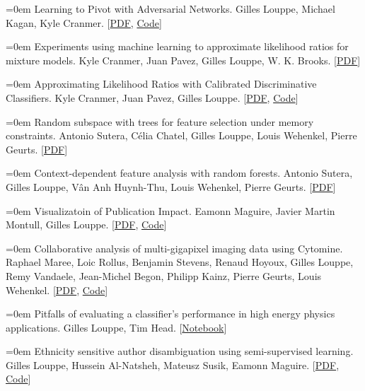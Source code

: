 \documentclass{scrartcl}
\newcommand{\MarginText}[1]{\marginpar{\raggedleft\itshape\small#1}}
\newcommand{\NewPublication}[4]{\noindent\hangindent=0em\hangafter=0 \MarginText{\color{black} #1}{\footnotesize [{\color{Maroon}#2}]} #3 {\footnotesize\color{gray}#4}\vspace{0.5em}}
\begin{document}
\begin{cv}{}
\vspace{1em}

\NewPublication{2016}{22}{Learning to Pivot with Adversarial Networks.}{%
Gilles Louppe, Michael Kagan, Kyle Cranmer.
[\href{https://arxiv.org/abs/1611.01046}{PDF}, \href{https://github.com/glouppe/paper-learning-to-pivot}{Code}]}

\NewPublication{}{21}{Experiments using machine learning to approximate likelihood ratios for mixture models.}{%
Kyle Cranmer, Juan Pavez, Gilles Louppe, W. K. Brooks.
[\href{http://iopscience.iop.org/article/10.1088/1742-6596/762/1/012034/pdf}{PDF}]}

\NewPublication{}{20}{Approximating Likelihood Ratios with Calibrated Discriminative Classifiers.}{%
Kyle Cranmer, Juan Pavez, Gilles Louppe.
[\href{http://arxiv.org/abs/1506.02169}{PDF}, \href{https://github.com/diana-hep/carl}{Code}]}

\NewPublication{}{19}{Random subspace with trees for feature selection under memory constraints.}{%
Antonio Sutera, Célia Chatel, Gilles Louppe, Louis Wehenkel, Pierre Geurts.
[\href{http://hdl.handle.net/2268/202206}{PDF}]}

\NewPublication{}{18}{Context-dependent feature analysis with random forests.}{%
Antonio Sutera, Gilles Louppe, Vân Anh Huynh-Thu, Louis Wehenkel, Pierre Geurts.
[\href{https://arxiv.org/abs/1605.03848}{PDF}]}

\NewPublication{}{17}{Visualizatoin of Publication Impact.}{%
Eamonn Maguire, Javier Martin Montull, Gilles Louppe.
[\href{https://arxiv.org/abs/1605.06242}{PDF}, \href{https://github.com/inspirehep/impact-graphs}{Code}]}

\NewPublication{}{16}{Collaborative analysis of multi-gigapixel imaging data using Cytomine.}{%
Raphael Maree, Loic Rollus, Benjamin Stevens, Renaud Hoyoux, Gilles Louppe, Remy Vandaele, Jean-Michel Begon, Philipp Kainz, Pierre Geurts, Louis Wehenkel.
[\href{http://bioinformatics.oxfordjournals.org/content/early/2016/01/09/bioinformatics.btw013.full.pdf+html}{PDF}, \href{http://www.cytomine.be/}{Code}]}

\NewPublication{2015}{15}{Pitfalls of evaluating a classifier’s performance in high energy physics applications.}{%
Gilles Louppe, Tim Head.
[\href{http://dx.doi.org/10.5281/zenodo.34934}{Notebook}]}

\NewPublication{}{14}{Ethnicity sensitive author disambiguation using semi-supervised learning.}{%
Gilles Louppe, Hussein Al-Natsheh, Mateusz Susik, Eamonn Maguire.
[\href{http://arxiv.org/abs/1508.07744}{PDF}, \href{https://github.com/glouppe/paper-author-disambiguation/}{Code}]}


\end{cv}
\end{document}

